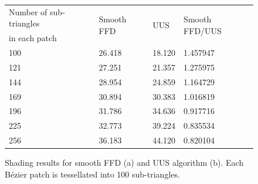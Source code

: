 \documentclass[3p]{elsarticle}
\makeatletter
\newcommand\tabcaption{\def\@captype{table}\caption}
\makeatother
\begin{document}
\begin{figure}[htb] 
  \begin{minipage}[c]{0.66\textwidth} 
	\centering
	\footnotesize
	\tabcaption{Runtime comparison between smooth FFD and modified GPU-based UUS (ms)}
		\begin{tabular}{llll}
			\hline
				Number of sub-triangles & \multirow{2}{*}{Smooth FFD} & \multirow{2}{*}{UUS} &
				\multirow{2}{*}{Smooth FFD/UUS} \\
				in each patch & \multirow{2}{*}{} & \multirow{2}{*}{} & \multirow{2}{*}{} \\
			\hline
				100 & 26.418 & 18.120 & 1.457947 \\
				121 & 27.251 & 21.357 & 1.275975 \\
				144 & 28.954 & 24.859 & 1.164729 \\
				169 & 30.894 & 30.383 & 1.016819 \\
				196 & 31.786 & 34.636 & 0.917716 \\
				225 & 32.773 & 39.224 & 0.835534 \\
				256 & 36.183 & 44.120 & 0.820104 \\
			\hline
		\end{tabular}
	\label{tab:uus}
  \end{minipage} 
  \begin{minipage}[c]{0.33\textwidth} 
		\centering
		\caption{Shading results for smooth FFD (a) and UUS algorithm (b). Each B\'ezier patch is
		tessellated into 100 sub-triangles.}
		\label{fig:uus}
  \end{minipage}%
\end{figure}
\end{document}
